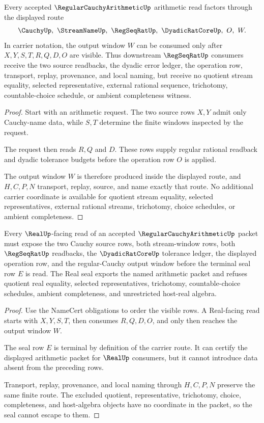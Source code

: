 \begin{theorem}
\label{thm:regular-cauchy-arithmetic-regseqrat-route}
Every accepted $\RegularCauchyArithmeticUp$ arithmetic read factors through the displayed route
$$
\CauchyUp,\ \StreamNameUp,\ \RegSeqRatUp,\ \DyadicRatCoreUp,\ O,\ W .
$$
In carrier notation, the output window $W$ can be consumed only after $X,Y,S,T,R,Q,D,O$ are visible. Thus downstream $\RegSeqRatUp$ consumers receive the two source readbacks, the dyadic error ledger, the operation row, transport, replay, provenance, and local naming, but receive no quotient stream equality, selected representative, external rational sequence, trichotomy, countable-choice schedule, or ambient completeness witness.
\end{theorem}
\begin{proof}
Start with an arithmetic request. The two source rows $X,Y$ admit only Cauchy-name data, while $S,T$ determine the finite windows inspected by the request.

The request then reads $R,Q$ and $D$. These rows supply regular rational readback and dyadic tolerance budgets before the operation row $O$ is applied.

The output window $W$ is therefore produced inside the displayed route, and $H,C,P,N$ transport, replay, source, and name exactly that route. No additional carrier coordinate is available for quotient stream equality, selected representatives, external rational streams, trichotomy, choice schedules, or ambient completeness.
\end{proof}

\begin{theorem}
\label{thm:regular-cauchy-arithmetic-real-seal-nonescape}
Every $\RealUp$-facing read of an accepted $\RegularCauchyArithmeticUp$ packet must expose the two Cauchy source rows, both stream-window rows, both $\RegSeqRatUp$ readbacks, the $\DyadicRatCoreUp$ tolerance ledger, the displayed operation row, and the regular-Cauchy output window before the terminal seal row $E$ is read. The Real seal exports the named arithmetic packet and refuses quotient real equality, selected representatives, trichotomy, countable-choice schedules, ambient completeness, and unrestricted host-real algebra.
\end{theorem}
\begin{proof}
Use the NameCert obligations to order the visible rows. A Real-facing read starts with $X,Y,S,T$, then consumes $R,Q,D,O$, and only then reaches the output window $W$.

The seal row $E$ is terminal by definition of the carrier route. It can certify the displayed arithmetic packet for $\RealUp$ consumers, but it cannot introduce data absent from the preceding rows.

Transport, replay, provenance, and local naming through $H,C,P,N$ preserve the same finite route. The excluded quotient, representative, trichotomy, choice, completeness, and host-algebra objects have no coordinate in the packet, so the seal cannot escape to them.
\end{proof}

